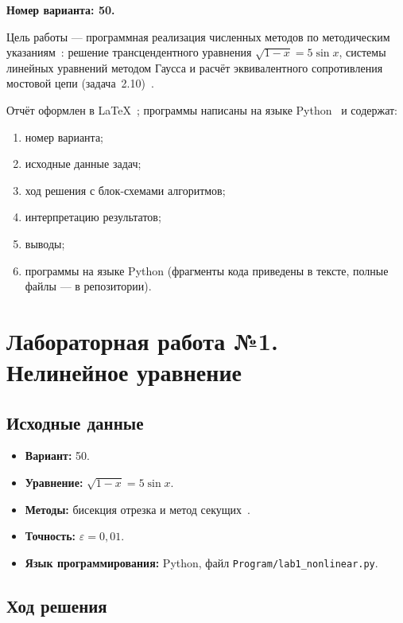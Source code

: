 \documentclass[12pt,a4paper]{scrartcl}
\begin{document}
\textbf{Номер варианта: 50.}

Цель работы --- программная реализация численных методов по методическим указаниям~\cite{Zadanie-2026}: решение трансцендентного уравнения $\sqrt{1-x}=5\sin x$, системы линейных уравнений методом Гаусса и расчёт эквивалентного сопротивления мостовой цепи (задача~2.10)~\cite{Uvarov-2000, Samarsky-1989, Trofimov-2015}.

Отчёт оформлен в \LaTeX{}~\cite{Lvovsky-2003}; программы написаны на языке Python~\cite{Python-2026} и содержат:
\begin{enumerate}
 \item номер варианта;
 \item исходные данные задач;
 \item ход решения с блок-схемами алгоритмов;
 \item интерпретацию результатов;
 \item выводы;
 \item программы на языке Python (фрагменты кода приведены в тексте, полные файлы --- в репозитории).
\end{enumerate}


\section{Лабораторная работа №1. Нелинейное уравнение}

\subsection{Исходные данные}

\begin{itemize}
 \item \textbf{Вариант:} 50.
 \item \textbf{Уравнение:} $\sqrt{1-x}=5\sin x$.
 \item \textbf{Методы:} бисекция отрезка и метод секущих~\cite{Uvarov-2000}.
 \item \textbf{Точность:} $\varepsilon = 0{,}01$.
 \item \textbf{Язык программирования:} Python, файл \texttt{Program/lab1\_nonlinear.py}.
\end{itemize}

\subsection{Ход решения}
\end{document}
